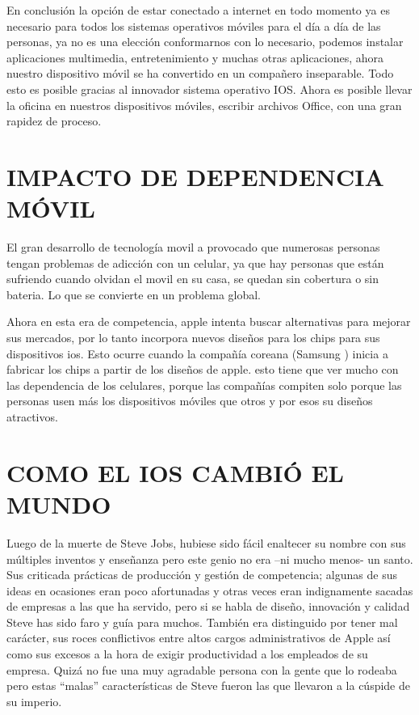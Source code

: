En conclusión la opción de estar conectado a internet en todo
momento ya es necesario para todos los sistemas operativos
móviles para el día a día de las personas, ya no es una elección
conformarnos con lo necesario, podemos instalar aplicaciones
multimedia, entretenimiento y muchas otras aplicaciones, ahora
nuestro dispositivo móvil se ha convertido en un compañero
inseparable. Todo esto es posible gracias al innovador sistema
operativo IOS. Ahora es posible llevar la oficina en nuestros
dispositivos móviles, escribir archivos Office, con una gran
rapidez de proceso.

\section*{IMPACTO DE DEPENDENCIA MÓVIL}

El gran desarrollo de tecnología movil a provocado que
numerosas personas tengan problemas de adicción con un
celular, ya que hay personas que están sufriendo cuando olvidan
el movil en su casa, se quedan sin cobertura o sin bateria. Lo
que se convierte en un problema global.

Ahora en esta era de competencia, apple intenta buscar
alternativas para mejorar sus mercados, por lo tanto incorpora
nuevos diseños para los chips para sus dispositivos ios. Esto
ocurre cuando la compañía coreana (Samsung ) inicia a fabricar
los chips a partir de los diseños de apple. esto tiene que ver
mucho con las dependencia de los celulares, porque las
compañías compiten solo porque las personas usen más los
dispositivos móviles que otros y por esos su diseños atractivos.

\section*{COMO EL IOS CAMBIÓ EL MUNDO}

Luego de la muerte de Steve Jobs, hubiese sido fácil enaltecer
su nombre con sus múltiples inventos y enseñanza pero este
genio no era –ni mucho menos- un santo. Sus criticada prácticas
de producción y gestión de competencia; algunas de sus ideas
en ocasiones eran poco afortunadas y otras veces eran
indignamente sacadas de empresas a las que ha servido, pero si
se habla de diseño, innovación y calidad Steve has sido faro y
guía para muchos. También era distinguido por tener mal
carácter, sus roces conflictivos entre altos cargos
administrativos de Apple así como sus excesos a la hora de
exigir productividad a los empleados de su empresa. Quizá no
fue una muy agradable persona con la gente que lo rodeaba
pero estas “malas” características de Steve fueron las que
llevaron a la cúspide de su imperio.

